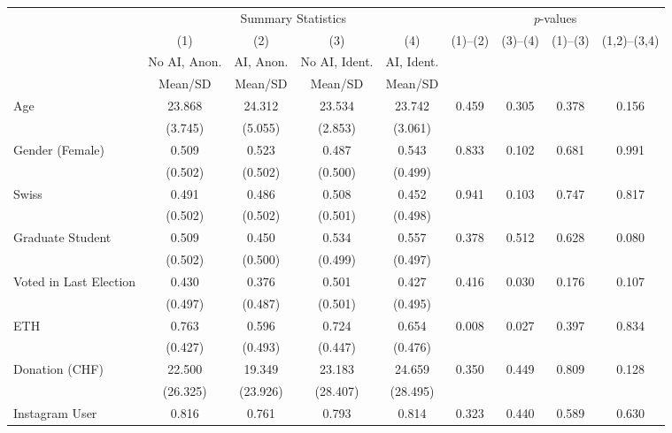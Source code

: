 \begin{tabular}{l*{8}{c}}
\hline\hline
& \multicolumn{4}{c}{Summary Statistics}
& \multicolumn{4}{c}{\textit{p}-values} \\
& (1) & (2) & (3) & (4)
& (1)--(2) & (3)--(4) & (1)--(3) & (1,2)--(3,4) \\
& No AI, Anon. & AI, Anon. & No AI, Ident. & AI, Ident.
& & & & \\
& Mean/SD & Mean/SD & Mean/SD & Mean/SD & & & & \\
\hline
Age             &   23.868&   24.312&   23.534&   23.742&    0.459&    0.305&    0.378&    0.156\\
                &  (3.745)&  (5.055)&  (2.853)&  (3.061)&         &         &         &         \\
Gender (Female) &    0.509&    0.523&    0.487&    0.543&    0.833&    0.102&    0.681&    0.991\\
                &  (0.502)&  (0.502)&  (0.500)&  (0.499)&         &         &         &         \\
Swiss           &    0.491&    0.486&    0.508&    0.452&    0.941&    0.103&    0.747&    0.817\\
                &  (0.502)&  (0.502)&  (0.501)&  (0.498)&         &         &         &         \\
Graduate Student&    0.509&    0.450&    0.534&    0.557&    0.378&    0.512&    0.628&    0.080\\
                &  (0.502)&  (0.500)&  (0.499)&  (0.497)&         &         &         &         \\
Voted in Last Election&    0.430&    0.376&    0.501&    0.427&    0.416&    0.030&    0.176&    0.107\\
                &  (0.497)&  (0.487)&  (0.501)&  (0.495)&         &         &         &         \\
ETH             &    0.763&    0.596&    0.724&    0.654&    0.008&    0.027&    0.397&    0.834\\
                &  (0.427)&  (0.493)&  (0.447)&  (0.476)&         &         &         &         \\
Donation (CHF)  &   22.500&   19.349&   23.183&   24.659&    0.350&    0.449&    0.809&    0.128\\
                & (26.325)& (23.926)& (28.407)& (28.495)&         &         &         &         \\
Instagram User  &    0.816&    0.761&    0.793&    0.814&    0.323&    0.440&    0.589&    0.630\\

\end{tabular}
